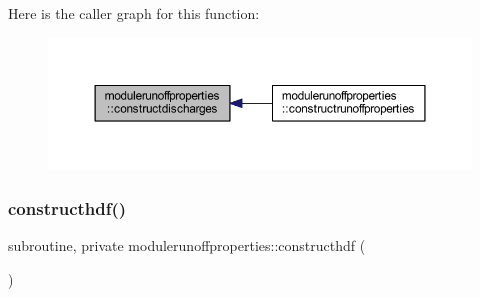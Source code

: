 Here is the caller graph for this function\+:\nopagebreak
\begin{figure}[H]
\begin{center}
\leavevmode
\includegraphics[width=350pt]{namespacemodulerunoffproperties_af8a32b20348bababc5852a1a5ce34acc_icgraph}
\end{center}
\end{figure}
\mbox{\label{namespacemodulerunoffproperties_ab553b53f61f80a77a664735dc1b72d44}} 
\subsubsection{\texorpdfstring{constructhdf()}{constructhdf()}}
{\footnotesize\ttfamily subroutine, private modulerunoffproperties\+::constructhdf (\begin{DoxyParamCaption}{ }\end{DoxyParamCaption})\hspace{0.3cm}{\ttfamily [private]}}

